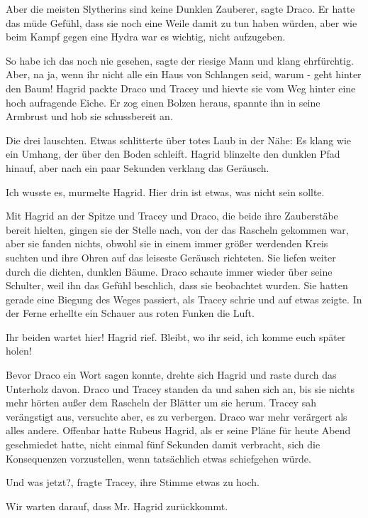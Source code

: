 \glqq{}Aber die meisten Slytherins sind keine Dunklen Zauberer\grqq{}, sagte
Draco. Er hatte das müde Gefühl, dass sie noch eine Weile damit zu tun
haben würden, aber wie beim Kampf gegen eine Hydra war es wichtig, nicht
aufzugeben.

\glqq{}So habe ich das noch nie gesehen\grqq{}, sagte der riesige Mann und klang
ehrfürchtig. \glqq{}Aber, na ja, wenn ihr nicht alle ein Haus von
Schlangen seid, warum - geht hinter den Baum!\grqq{} Hagrid packte Draco
und Tracey und hievte sie vom Weg hinter eine hoch aufragende Eiche. Er
zog einen Bolzen heraus, spannte ihn in seine Armbrust und hob sie
schussbereit an.

Die drei lauschten. Etwas schlitterte über totes Laub in der Nähe: Es klang wie
ein Umhang, der über den Boden schleift. Hagrid blinzelte den dunklen
Pfad hinauf, aber nach ein paar Sekunden verklang das Geräusch.

\glqq{}Ich wusste es\grqq{}, murmelte Hagrid. \glqq{}Hier drin ist etwas, was
nicht sein sollte.\grqq{}

Mit Hagrid an der Spitze und Tracey und Draco, die beide ihre Zauberstäbe bereit
hielten, gingen sie der Stelle nach, von der das Rascheln gekommen war,
aber sie fanden nichts, obwohl sie in einem immer größer werdenden Kreis
suchten und ihre Ohren auf das leiseste Geräusch richteten. Sie liefen
weiter durch die dichten, dunklen Bäume. Draco schaute immer wieder über
seine Schulter, weil ihn das Gefühl beschlich, dass sie beobachtet
wurden. Sie hatten gerade eine Biegung des Weges passiert, als Tracey
schrie und auf etwas zeigte. In der Ferne erhellte ein Schauer aus roten
Funken die Luft.

\glqq{}Ihr beiden wartet hier!\grqq{} Hagrid rief. \glqq{}Bleibt, wo ihr seid, ich
komme euch später holen!\grqq{}

Bevor Draco ein Wort sagen konnte, drehte sich Hagrid und raste durch das
Unterholz davon. Draco und Tracey standen da und sahen sich an, bis sie
nichts mehr hörten außer dem Rascheln der Blätter um sie herum. Tracey
sah verängstigt aus, versuchte aber, es zu verbergen. Draco war mehr
verärgert als alles andere. Offenbar hatte Rubeus Hagrid, als er seine
Pläne für heute Abend geschmiedet hatte, nicht einmal fünf Sekunden damit
verbracht, sich die Konsequenzen vorzustellen, wenn tatsächlich etwas
schiefgehen würde.

\glqq{}Und was jetzt?\grqq{}, fragte Tracey, ihre Stimme etwas zu hoch.

\glqq{}Wir warten darauf, dass Mr. Hagrid zurückkommt.\grqq{}

